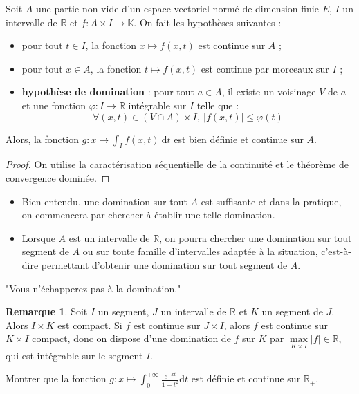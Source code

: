\documentclass[french]{article}
\newcommand{\R}{\mathbb{R}}
\newcommand{\K}{\mathbb{K}}
\renewcommand{\d}{\text{d}}
\theoremstyle{plain}
\theoremstyle{definition}
\newtheorem*{rmq}{Remarque}
\theoremstyle{remark}
\begin{document}
\begin{thm}
	Soit $A$ une partie non vide d'un espace vectoriel normé de dimension finie $E$, $I$ un intervalle de $\R$ et $f:A\times I\to\K$. On fait les hypothèses suivantes :
	\begin{itemize}
		\item pour tout $t\in I$, la fonction $x\mapsto f(x,t)$ est continue sur $A$ ;
		\item pour tout $x\in A$, la fonction $t\mapsto f(x,t)$ est continue par morceaux sur $I$ ;
		\item \textbf{hypothèse de domination} : pour tout $a\in A$, il existe un voisinage $V$ de $a$ et une fonction $\varphi:I\to\R$ intégrable sur $I$ telle que : $$\forall (x,t)\in (V\cap A)\times I,\ \lvert f(x,t)\rvert\leqslant\varphi(t)$$
	\end{itemize} Alors, la fonction $g:x\mapsto\displaystyle\int_I f(x,t)\ \d t$ est bien définie et continue sur $A$.
\end{thm}
\begin{proof}
	On utilise la caractérisation séquentielle de la continuité et le théorème de convergence dominée.
\end{proof}

\begin{met}
	\begin{itemize}
		\item Bien entendu, une domination sur tout $A$ est suffisante et dans la pratique, on commencera par chercher à établir une telle domination.
		\item Lorsque $A$ est un intervalle de $\R$, on pourra chercher une domination sur tout segment de $A$ ou sur toute famille d'intervalles adaptée à la situation, c'est-à-dire permettant d'obtenir une domination sur tout segment de $A$.
	\end{itemize}
\end{met}

"Vous n'échapperez pas à la domination."

\begin{rmq}
	Soit $I$ un segment, $J$ un intervalle de $\R$ et $K$ un segment de $J$. Alors $I\times K$ est compact. Si $f$ est continue sur $J\times I$, alors $f$ est continue sur $K\times I$ compact, donc on dispose d'une domination de $f$ sur $K$ par $\underset{K\times I}{\max}\lvert f\rvert\in\R$, qui est intégrable sur le segment $I$.
\end{rmq}

\begin{exo}
	Montrer que la fonction $g:x\mapsto\displaystyle\int_{0}^{+\infty}\frac{e^{-xt}}{1+t^2}\d t$ est définie et continue sur $\R_+$.
\end{exo}
\end{document}

